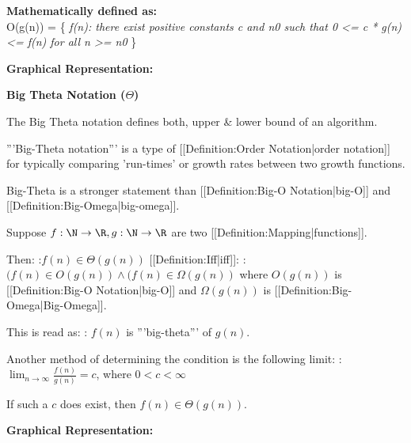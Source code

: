 \textbf{Mathematically defined as:}\\
O(g(n)) = \{ \emph{f(n): there exist positive constants c and n0 such
	that 0 \textless= c * g(n) \textless= f(n) for all n \textgreater= n0}
\}

\textbf{Graphical Representation:}


\hypertarget{5215}{\label{5215}}

\textbf{Big Theta Notation ($\Theta$)}

The Big Theta notation defines both, upper \& lower bound of an
algorithm.


'''Big-Theta notation''' is a type of [[Definition:Order Notation|order notation]] for typically comparing 'run-times' or growth rates between two growth functions.

Big-Theta is a stronger statement than [[Definition:Big-O Notation|big-O]] and [[Definition:Big-Omega|big-omega]].


Suppose $f: \N \to \R, g: \N \to \R$ are two [[Definition:Mapping|functions]].

Then:
:$f \left({n}\right) \in \Theta \left({g \left({n}\right)}\right)$ 
[[Definition:Iff|iff]]:
:$(f \left({n}\right) \in O \left({g \left({n}\right)}\right) \land (f \left({n}\right) \in \Omega \left({g \left({n}\right)}\right)$
where $O \left({g \left({n}\right)}\right)$ is [[Definition:Big-O Notation|big-O]] and $\Omega \left({g \left({n}\right)}\right)$ is [[Definition:Big-Omega|Big-Omega]].


This is read as:
: $f \left({n}\right)$ is '''big-theta''' of $g \left({n}\right)$.


Another method of determining the condition is the following limit:
:$\displaystyle \lim_{n \to \infty} \frac{f \left({n}\right)}{g \left({n}\right)} = c$, where $0 < c < \infty$

If such a $c$ does exist, then $f \left({n}\right) \in \Theta (g \left({n}\right))$.

\textbf{Graphical Representation:}

